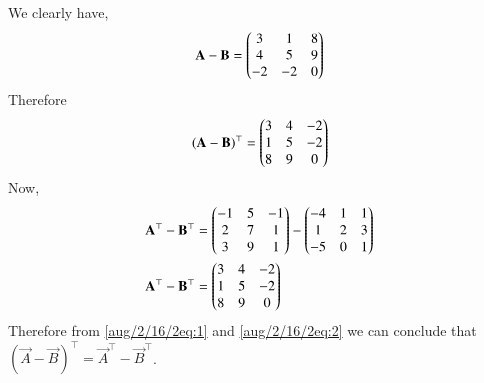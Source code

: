 


We clearly have,
\begin{align}
\mathbf{A}-\mathbf{B} =
\begin{pmatrix}
3 & 1 & 8\\
4 & 5 & 9\\
-2 & -2 & 0\end{pmatrix}
\end{align}
Therefore 
\begin{align}
(\mathbf{A}-\mathbf{B})^\top =
\begin{pmatrix}
3 & 4 & -2\\
1 & 5 & -2\\
8 & 9 & 0\end{pmatrix}\label{aug/2/16/2eq:1}
\end{align}
Now,
\begin{align}
\mathbf{A}^\top-\mathbf{B}^\top &=
\begin{pmatrix}
-1 & 5 & -1\\
2 & 7 & 1\\
3 & 9 & 1\end{pmatrix}-
\begin{pmatrix}
-4 & 1 & 1\\
1 & 2 & 3\\
-5 & 0 & 1\end{pmatrix}\\
\mathbf{A}^\top-\mathbf{B}^\top &=
\begin{pmatrix}
3 & 4 & -2\\
1 & 5 & -2\\
8 & 9 & 0\end{pmatrix}\label{aug/2/16/2eq:2}
\end{align}
Therefore from \eqref{aug/2/16/2eq:1} and \eqref{aug/2/16/2eq:2} we can conclude that $(\vec{A}-\vec{B})^\top = \vec{A}^\top-\vec{B}^\top$.




